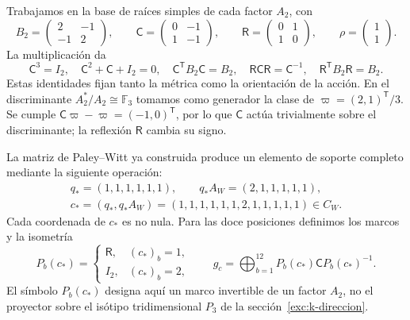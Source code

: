 Trabajamos en la base de raíces simples de cada factor \(A_2\), con
\begin{equation}
 B_2=\begin{pmatrix}2&-1\\-1&2\end{pmatrix},\qquad
 \mathsf C=\begin{pmatrix}0&-1\\1&-1\end{pmatrix},\qquad
 \mathsf R=\begin{pmatrix}0&1\\1&0\end{pmatrix},\qquad
 \rho=\begin{pmatrix}1\\1\end{pmatrix}.
 \label{km:coxeter-reflexion}
\end{equation}
La multiplicación da
\[
 \mathsf C^3=I_2,\quad
 \mathsf C^2+\mathsf C+I_2=0,\quad
 \mathsf C^{\mathsf T}B_2\mathsf C=B_2,\quad
 \mathsf R\mathsf C\mathsf R=\mathsf C^{-1},\quad
 \mathsf R^{\mathsf T}B_2\mathsf R=B_2.
\]
Estas identidades fijan tanto la métrica como la orientación de la acción.
En el discriminante \(A_2^*/A_2\cong\mathbb F_3\) tomamos como
generador la clase de \(\varpi=(2,1)^{\mathsf T}/3\). Se cumple
\(\mathsf C\varpi-\varpi=(-1,0)^{\mathsf T}\), por lo que
\(\mathsf C\) actúa trivialmente sobre el discriminante; la reflexión
\(\mathsf R\) cambia su signo.

La matriz de Paley--Witt ya construida produce un elemento de soporte
completo mediante la siguiente operación:
\begin{equation}
 \begin{gathered}
 q_*=(1,1,1,1,1,1),\qquad q_*A_W=(2,1,1,1,1,1),\\
 c_*=(q_*,q_*A_W)
 =(1,1,1,1,1,1,2,1,1,1,1,1)\in C_W.
 \end{gathered}
 \label{km:palabra-total}
\end{equation}
Cada coordenada de \(c_*\) es no nula. Para las doce posiciones
definimos los marcos y la isometría
\begin{equation}
 P_b(c_*)=
 \begin{cases}\mathsf R,&(c_*)_b=1,\\I_2,&(c_*)_b=2,\end{cases}
 \qquad
 g_c=\bigoplus_{b=1}^{12}P_b(c_*)\mathsf C P_b(c_*)^{-1}.
 \label{km:isometria-ternaria}
\end{equation}
El símbolo \(P_b(c_*)\) designa aquí un marco invertible de un factor
\(A_2\), no el proyector sobre el isótipo tridimensional \(P_3\)
de la sección~\ref{exc:k-direccion}.

